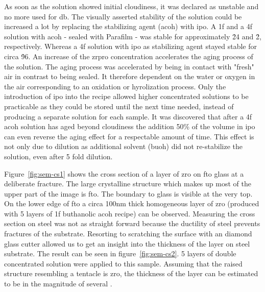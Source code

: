 As soon as the solution showed initial cloudiness, it was declared as unstable and no more used for \gls{db}. 
The visually asserted stability of the solution could be increased a lot by replacing the stabilizing agent (\gls{acoh}) with \gls{ipo}.
A \gls{1f} and a \gls{4f} solution with \gls{acoh} - sealed with Parafilm - was stable for approximately \h{24} and \h{2}, respectively.
Whereas a \gls{4f} solution with \gls{ipo} as stabilizing agent stayed stable for circa \h{96}. 
An increase of the \gls{zrpro} concentration accelerates the aging process of the solution.
The aging process was accelerated by being in contact with "fresh" air in contrast to being sealed. 
It therefore dependent on the water or oxygen in the air corresponding to an oxidation or hyrolization process.
%
Only the introduction of \gls{ipo} into the recipe allowed higher concentrated solutions to be practicable 
as they could be stored until the next time needed, instead of producing a separate solution for each sample.
%
It was discovered that after a \gls{4f} \gls{acoh} solution has aged beyond cloudiness 
the addition 50\% of the volume in \gls{ipo} can even reverse the aging effect for a respectable amount of time. 
This effect is not only due to dilution as additional solvent (\gls{buoh}) did not re-stabilize the solution, 
even after 5 fold dilution. 

Figure~\ref{fig:sem-cs1} shows the cross section of a layer of \gls{zro} on \gls{fto} glass at a deliberate fracture.
The large crystalline structure which makes up most of the upper part of the image is \gls{fto}. 
The boundary to glass is visible at the very top. 
On the lower edge of \gls{fto} a circa 100nm thick homogeneous layer of \gls{zro} (produced with 5 layers of \gls{1f} buthanolic \gls{acoh} recipe)  can be observed.
Measuring the cross section on steel was not as straight forward because the ductility of steel prevents fractures of the substrate. 
Resorting to scratching the surface with an diamond glass cutter allowed us to get an insight into the thickness of the layer on steel substrate.
%
The result can be seen in figure~\ref{fig:sem-cs2}. 
5 layers of double concentrated solution were applied to this sample. 
Assuming that the raised structure resembling a tentacle is \gls{zro}, 
the thickness of the layer can be estimated to be in the magnitude of several .

